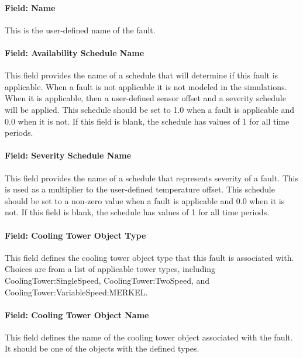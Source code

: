\paragraph{Field: Name}

This is the user-defined name of the fault.

\paragraph{Field: Availability Schedule Name}

This field provides the name of a schedule that will determine if this fault is applicable. When a fault is not applicable it is not modeled in the simulations. When it is applicable, then a user-defined sensor offset and a severity schedule will be applied. This schedule should be set to 1.0 when a fault is applicable and 0.0 when it is not. If this field is blank, the schedule has values of 1 for all time periods.

\paragraph{Field: Severity Schedule Name}\label{field-severity-schedule-name}

This field provides the name of a schedule that represents severity of a fault. This is used as a multiplier to the user-defined temperature offset. This schedule should be set to a non-zero value when a fault is applicable and 0.0 when it is not. If this field is blank, the schedule has values of 1 for all time periods.

\paragraph{Field: Cooling Tower Object Type}\label{field-tower-object-type}

This field defines the cooling tower object type that this fault is associated with. Choices are from a list of applicable tower types, including CoolingTower:SingleSpeed, CoolingTower:TwoSpeed, and CoolingTower:VariableSpeed:MERKEL.

\paragraph{Field: Cooling Tower Object Name}\label{field-tower-object-name}

This field defines the name of the cooling tower object associated with the fault. It should be one of the objects with the defined types.


